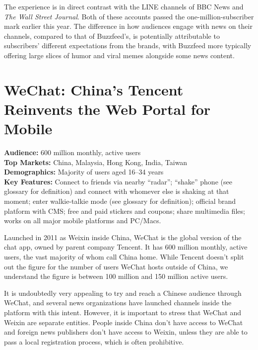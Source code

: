 \documentclass[notoc, symmetric, nobib, nols]{towcenter-guideto-book}
\begin{document}
The experience is in direct contrast with the LINE channels of BBC News and \textit{The Wall Street Journal}. Both of these accounts passed the one-million-subscriber mark earlier this year. The difference in how audiences engage with news on their channels, compared to that of Buzzfeed's, is potentially attributable to subscribers' different expectations from the brands, with Buzzfeed more typically offering large slices of humor and viral memes alongside some news content.

\section{WeChat: China's Tencent Reinvents the Web Portal for Mobile}

\begin{framed}
\noindent\textbf{Audience:} 600 million monthly, active users\\
\noindent\textbf{Top Markets:} China, Malaysia, Hong Kong, India, Taiwan\\
\noindent\textbf{Demographics:} Majority of users aged 16--34 years\\
\noindent\textbf{Key Features:} Connect to friends via nearby ``radar''; ``shake'' phone (see glossary for definition) and connect with whomever else is shaking at that moment; enter walkie-talkie mode (see glossary for definition); official brand platform with CMS; free and paid stickers and coupons; share multimedia files; works on all major mobile platforms and PC/Macs.
\end{framed}
\vspace{\baselineskip}
Launched in 2011 as Weixin inside China, WeChat is the global version of the chat app, owned by parent company Tencent. It has 600 million monthly, active users,\autocite{TencentResults} the vast majority of whom call China home. While Tencent doesn't split out the figure for the number of users WeChat hosts outside of China, we understand the figure is between 100 million and 150 million active users.

It is undoubtedly very appealing to try and reach a Chinese audience through WeChat, and several news organizations have launched channels inside the platform with this intent. However, it is important to stress that WeChat and Weixin are separate entities. People inside China don't have access to WeChat and foreign news publishers don't have access to Weixin, unless they are able to pass a local registration process, which is often prohibitive.
\end{document}

